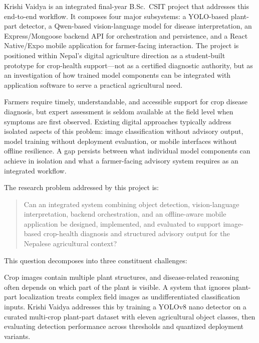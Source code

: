 Krishi Vaidya is an integrated final-year B.Sc.\ CSIT project that addresses this end-to-end
workflow. It composes four major subsystems: a YOLO-based plant-part detector, a Qwen-based
vision-language model for disease interpretation, an Express/Mongoose backend API for
orchestration and persistence, and a React Native/Expo mobile application for farmer-facing
interaction. The project is positioned within Nepal's digital agriculture direction as a
student-built prototype for crop-health support---not as a certified diagnostic authority, but
as an investigation of how trained model components can be integrated with application software
to serve a practical agricultural need.


Farmers require timely, understandable, and accessible support for crop disease diagnosis, but
expert assessment is seldom available at the field level when symptoms are first observed.
Existing digital approaches typically address isolated aspects of this problem: image
classification without advisory output, model training without deployment evaluation, or mobile
interfaces without offline resilience. A gap persists between what individual model components
can achieve in isolation and what a farmer-facing advisory system requires as an integrated
workflow.

The research problem addressed by this project is:

\begin{quote}
Can an integrated system combining object detection, vision-language interpretation, backend
orchestration, and an offline-aware mobile application be designed, implemented, and evaluated
to support image-based crop-health diagnosis and structured advisory output for the Nepalese
agricultural context?
\end{quote}

This question decomposes into three constituent challenges:


Crop images contain multiple plant structures, and disease-related reasoning often depends on
which part of the plant is visible. A system that ignores plant-part localization treats
complex field images as undifferentiated classification inputs. Krishi Vaidya addresses this
by training a YOLOv8 nano detector on a curated multi-crop plant-part dataset with eleven
agricultural object classes, then evaluating detection performance across thresholds and
quantized deployment variants.

